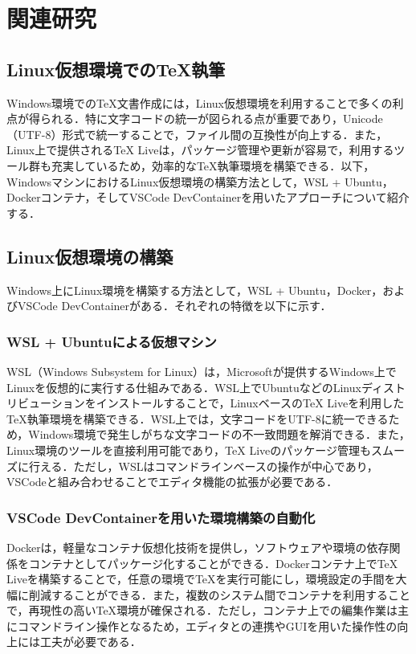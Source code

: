 \documentclass[main]{subfiles}
\begin{document}
\chapter{関連研究}
\section{Linux仮想環境での{\TeX}執筆}
Windows環境での{\TeX}文書作成には，Linux仮想環境を利用することで多くの利点が得られる．特に文字コードの統一が図られる点が重要であり，Unicode（UTF-8）形式で統一することで，ファイル間の互換性が向上する．また，Linux上で提供される{\TeX} Liveは，パッケージ管理や更新が容易で，利用するツール群も充実しているため，効率的な{\TeX}執筆環境を構築できる．以下，WindowsマシンにおけるLinux仮想環境の構築方法として，WSL + Ubuntu，Dockerコンテナ，そしてVSCode DevContainerを用いたアプローチについて紹介する．

\section{Linux仮想環境の構築}
Windows上にLinux環境を構築する方法として，WSL + Ubuntu，Docker，およびVSCode DevContainerがある．それぞれの特徴を以下に示す．

\subsection{WSL + Ubuntuによる仮想マシン}
WSL（Windows Subsystem for Linux）は，Microsoftが提供するWindows上でLinuxを仮想的に実行する仕組みである．WSL上でUbuntuなどのLinuxディストリビューションをインストールすることで，Linuxベースの{\TeX} Liveを利用した{\TeX}執筆環境を構築できる．WSL上では，文字コードをUTF-8に統一できるため，Windows環境で発生しがちな文字コードの不一致問題を解消できる．また，Linux環境のツールを直接利用可能であり，{\TeX} Liveのパッケージ管理もスムーズに行える．ただし，WSLはコマンドラインベースの操作が中心であり，VSCodeと組み合わせることでエディタ機能の拡張が必要である．

\subsection{VSCode DevContainerを用いた環境構築の自動化}
Dockerは，軽量なコンテナ仮想化技術を提供し，ソフトウェアや環境の依存関係をコンテナとしてパッケージ化することができる．Dockerコンテナ上で{\TeX} Liveを構築することで，任意の環境で{\TeX}を実行可能にし，環境設定の手間を大幅に削減することができる．また，複数のシステム間でコンテナを利用することで，再現性の高い{\TeX}環境が確保される．ただし，コンテナ上での編集作業は主にコマンドライン操作となるため，エディタとの連携やGUIを用いた操作性の向上には工夫が必要である．
\end{document}
